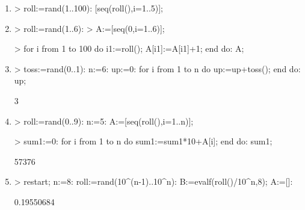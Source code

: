 \begin{enumerate}
\item
\begin{MapleInput}
> roll:=rand(1..100): 
  [seq(roll(),i=1..5)];
\end{MapleInput}
\begin{MapleOutput}
[27, 96, 17, 90, 34]
\end{MapleOutput}

\item
\begin{MapleInput}
> roll:=rand(1..6):
> A:=[seq(0,i=1..6)]; \end{MapleInput}
\begin{MapleOutput}
[0, 0, 0, 0, 0, 0]
\end{MapleOutput}
\begin{MapleInput}
> for i from 1 to 100 do 
    i1:=roll(); 
    A[i1]:=A[i1]+1; 
  end do:
  A;
\end{MapleInput}
\begin{MapleOutput}
[16, 18, 21, 18, 18, 9]
\end{MapleOutput}

\item
\begin{MapleInput}
> toss:=rand(0..1): 
  n:=6: 
  up:=0: 
  for i from 1 to n do 
    up:=up+toss(); 
  end do:
  up;
\end{MapleInput}
\begin{MapleOutput}
3
\end{MapleOutput}

\item
\begin{MapleInput}
> roll:=rand(0..9): 
  n:=5: 
  A:=[seq(roll(),i=1..n)];
\end{MapleInput}
\begin{MapleOutput}
[5, 7, 3, 7, 6]
\end{MapleOutput}

\begin{MapleInput}
> sum1:=0:
  for i from 1 to n do 
    sum1:=sum1*10+A[i]; 
  end do: 
  sum1;
\end{MapleInput}
\begin{MapleOutput}
57376
\end{MapleOutput}

\item
\begin{MapleInput}
> restart; 
  n:=8:
  roll:=rand(10^(n-1)..10^n): 
  B:=evalf(roll()/10^n,8); 
  A:=[]:
\end{MapleInput}
\begin{MapleOutput}
0.19550684
\end{MapleOutput}


\end{enumerate}
